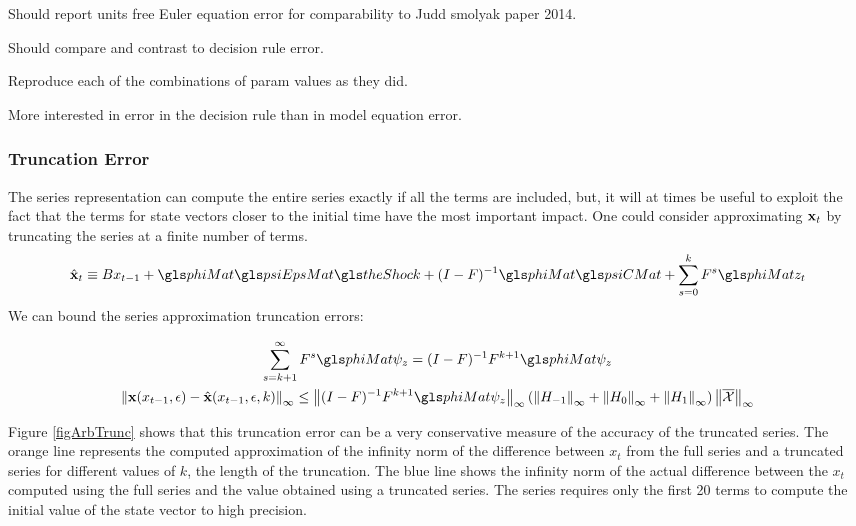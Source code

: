 \documentclass[12pt]{article}
\begin{document}
{\color{blue}
Should report units free Euler equation error for comparability to   Judd smolyak paper 2014.

Should compare and contrast to decision rule error.

Reproduce each of the combinations of param values as they did.

More interested in error in the decision rule than in model equation error.
}

\subsubsection{Truncation Error}


The series representation can compute the entire series exactly
if all the terms are included, but, it will at times be useful to exploit the fact that
the terms for state vectors closer 
to the initial time have the most important impact.
One could consider approximating  $\mathbf{x}_t$ by 
truncating the series  at a finite number of terms.
 	 \begin{gather}
 	 \xWOargK_t \equiv B x_{t-1}+ \phiMat \psiEpsMat\theShock  + (I - F)^{-1} \phiMat \psiCMat + \sum_{s=0}^k F^s \phiMat z_{t}\label{theTruncSeries}
 \end{gather}
We can bound the  series approximation truncation errors:

    \begin{gather}
      \label{eq:1}
\sum_{s=k+1}^{\infty} F^s \phiMat \psi_z = (I -F)^{-1} F^{k+1}\phiMat \psi_z       \\
\infNorm{\xWarg-\xWargK} \le \infNorm{(I -F)^{-1} F^{k+1}\phiMat \psi_z} \left ( \infNorm{H_{-1} }+ \infNorm{H_{0} }+ \infNorm{H_{1} } \right )\infNorm{\overline{\mathcal{X}}}
    \end{gather}


 Figure \ref{figArbTrunc} shows
that this truncation error can be  a very conservative measure of the accuracy
of the truncated series.  The orange line represents the computed approximation of
the infinity norm of the difference between $x_t$ from the full series and a truncated series for different values of $k$, the length of the truncation.  The blue line shows the infinity norm of the actual difference between the $x_t$ computed using the full series and the value obtained using a truncated series.  The series requires only the first 20 terms to compute
the initial value of the state vector to high precision. 
\end{document}
